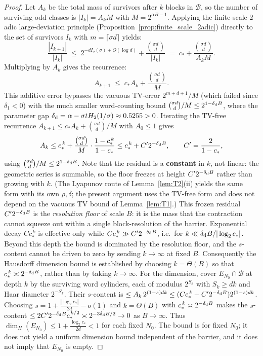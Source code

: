 \documentclass[12pt,a4paper]{article}
\theoremstyle{remark}
\begin{document}
\begin{proof}
Let $A_k$ be the total mass of survivors after $k$ blocks in $\mathcal B$, so the number of surviving odd classes is $|I_k|=A_k M$ with $M=2^{\alpha B-1}$. Applying the finite-scale $2$-adic large-deviation principle (Proposition~\ref{prop:finite_scale_2adic}) directly to the set of survivors $I_k$ with $m=\lceil\sigma d\rceil$ yields:
\[
\frac{|I_{k+1}|}{|I_k|} \;\le\; 2^{-dI_2(\sigma)+O(\log d)} + \frac{\binom{\sigma d}{d}}{|I_k|} \;=\; c_* + \frac{\binom{\sigma d}{d}}{A_k M}.
\]
Multiplying by $A_k$ gives the recurrence:
\[
A_{k+1} \;\le\; c_* A_k + \frac{\binom{\sigma d}{d}}{M}.
\]
This additive error bypasses the vacuous TV-error $2^{m+d+1}/M$ (which failed since $\delta_1 < 0$) with the much smaller word-counting bound $\binom{\sigma d}{d}/M \le 2^{1-\delta_{\rm d}B}$, where the parameter gap $\delta_{\rm d} = \alpha - \sigma t H_2(1/\sigma) \approx 0.5255 > 0$.
Iterating the TV-free recurrence $A_{k+1}\le c_*A_k+\binom{\sigma d}{d}/M$ with $A_0\le1$ gives
\[
A_k\le c_*^{\,k}+\frac{\binom{\sigma d}{d}}{M}\cdot\frac{1-c_*^{\,k}}{1-c_*}
\le c_*^{\,k}+C'2^{-\delta_{\rm d}B},\qquad C'=\frac{2}{1-c_*},
\]
using $\binom{\sigma d}{d}/M\le2^{1-\delta_{\rm d}B}$. Note that the residual is a \textbf{constant} in $k$, not linear: the geometric series is summable, so the floor freezes at height $C'2^{-\delta_{\rm d}B}$ rather than growing with $k$. (The Lyapunov route of Lemma~\ref{lem:T2}(ii) yields the same form with its own $\rho,\delta$; the present argument uses the TV-free form and does not depend on the vacuous TV bound of Lemma~\ref{lem:T1}.)
This frozen residual $C'2^{-\delta_{\rm d}B}$ is the \emph{resolution floor} of scale $B$: it is the mass that the contraction cannot squeeze out within a single block-resolution of the barrier. Exponential decay $Cc_*^{\,k}$ is effective only while $Cc_*^{\,k}\gg C'2^{-\delta_{\rm d}B}$, i.e.\ for $k\ll\delta_{\rm d}B/|\log_2 c_*|$. Beyond this depth the bound is dominated by the resolution floor, and the $s$-content cannot be driven to zero by sending $k\to\infty$ at fixed $B$. Consequently the Hausdorff dimension bound is established by choosing $k=\Theta(B)$ so that $c_*^{\,k}\asymp2^{-\delta_{\rm d}B}$, rather than by taking $k\to\infty$.
For the dimension, cover $E_{N_0}\cap\mathcal B$ at depth $k$ by the surviving
word cylinders, each of modulus $2^{S_k}$ with $S_k\ge dk$ and Haar diameter
$2^{-S_k}$. Their $s$-content is
$\le A_k\,2^{(1-s)dk}\le(Cc_*^{\,k}+C'2^{-\delta_{\rm d}B})2^{(1-s)dk}$.
Choosing $s=1+\frac{|\log_2 c_*|}{2d}-o(1)$ and $k=\Theta(B)$ with $c_*^{\,k}\asymp2^{-\delta_{\rm d}B}$ makes the $s$-content $\le2C'2^{-\delta_{\rm d}B}c_*^{\,k/2}\asymp2^{-3\delta_{\rm d}B/2}\to0$ as $B\to\infty$. Thus $\dim_H(E_{N_0})\le1+\frac{\log_2 c_*}{2d}<1$ for each fixed $N_0$. The bound is for fixed $N_0$; it does not yield a uniform dimension bound independent of the barrier, and it does not imply that $E_{N_0}$ is empty.

\end{proof}
\end{document}
